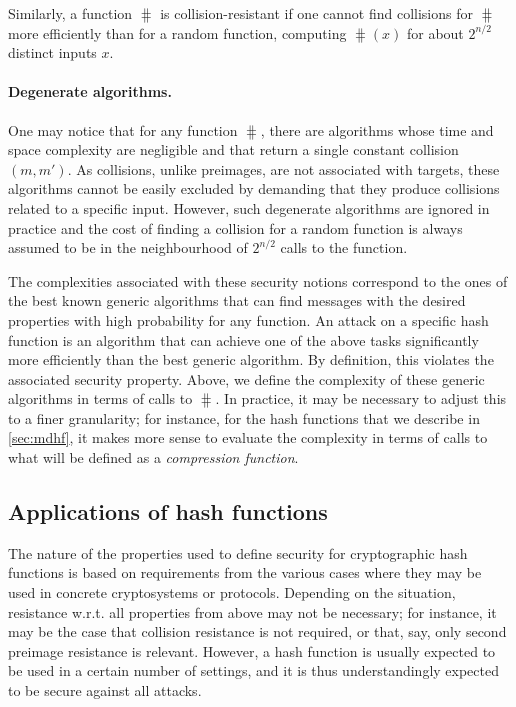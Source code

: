 Similarly, a function $\hash$ is collision-resistant if one cannot find collisions for $\hash$
more efficiently than for a random function, \ie computing $\hash(x)$ for about $2^{n/2}$ distinct inputs $x$.

\paragraph{Degenerate algorithms.}
One may notice that for any function $\hash$, there are algorithms whose time and space complexity are negligible and that
return a single constant collision $(m,m')$. As collisions, unlike preimages, are not associated with targets, these algorithms
cannot be easily excluded by demanding that they produce collisions related to a specific input. However, such degenerate algorithms
are ignored in practice and the cost of finding a collision for a random function is always assumed to be in the neighbourhood of
$2^{n/2}$ calls to the function.

The complexities associated with these security notions correspond to the ones of the best known generic algorithms that can find messages with the desired
properties with high probability for any function. An attack on a specific hash function is an algorithm that can achieve one of the above tasks significantly
more efficiently than the best generic algorithm. By definition, this violates the associated security property.
Above, we define the complexity of these generic algorithms in terms of calls to $\hash$. In practice, it may be necessary to adjust
this to a finer granularity; for instance, for the \merkdam hash functions that we describe in \autoref{sec:mdhf}, it makes more sense to evaluate the complexity
in terms of calls to what will be defined as a \emph{compression function}.

\subsection{Applications of hash functions}

The nature of the properties used to define security for cryptographic hash functions is based on
requirements from the various cases where they may be used in concrete cryptosystems or protocols.
Depending on the situation, resistance w.r.t. all properties from above may not be necessary;
for instance, it may be the case that collision resistance is not required, or that, say, only second preimage resistance
is relevant. However, a hash function is usually expected to be used in a certain number of settings, and it is thus understandingly expected to be secure against all attacks.

